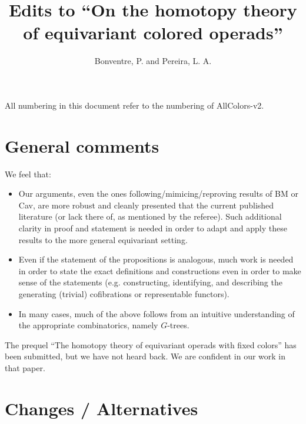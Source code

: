 \documentclass{article}
\begin{document}
 
 
\title{Edits to ``On the homotopy theory of equivariant colored operads''
\\[12pt]} %
 
\author{Bonventre, P. and Pereira, L. A.}
 
\maketitle
 


All numbering in this document refer to the numbering of AllColors-v2.



\section{General comments}

{\color{blue}
We feel that:
\begin{itemize}
\item Our arguments, even the ones following/mimicing/reproving results of BM or Cav, are more robust and cleanly presented that the current published literature (or lack there of, as mentioned by the referee).
        Such additional clarity in proof and statement is needed in order to adapt and apply these results to the more general equivariant setting.
\item Even if the statement of the propositions is analogous, much work is needed in order to state the exact definitions and constructions even in order to make sense of the statements
        (e.g. constructing, identifying, and describing the generating (trivial) cofibrations or  representable functors).
\item In many cases, much of the above follows from an intuitive understanding of the appropriate combinatorics, namely $G$-trees.
\end{itemize}
}

The prequel ``The homotopy theory of equivariant operads with fixed colors'' has been submitted, but we have not heard back.
We are confident in our work in that paper.

      

\section{Changes / Alternatives}
\end{document}

